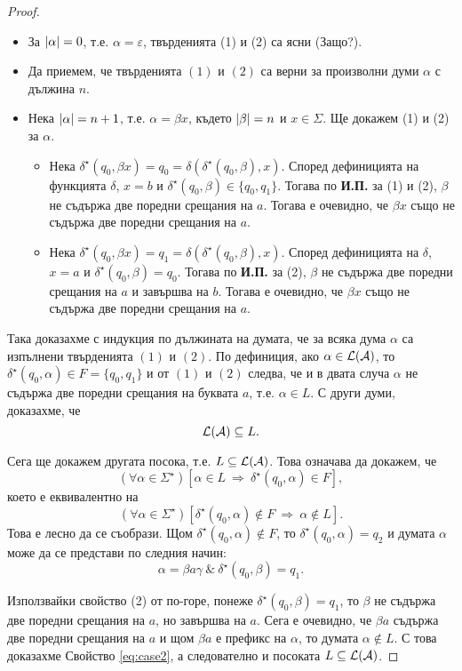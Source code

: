 \begin{proof}
 \begin{itemize}
 \item
   За $\lvert{\alpha}\rvert = 0$, т.е. $\alpha = \varepsilon$, твърденията (1) и (2) са ясни (Защо?).
 \item
   Да приемем, че твърденията $(1)$ и $(2)$ са верни за произволни думи $\alpha$ с дължина $n$.
 \item
   Нека $\lvert{\alpha}\rvert = n+1$, т.е. $\alpha = \beta x$, където $\lvert{\beta}\rvert = n$ и $x \in \Sigma$.
   Ще докажем (1) и (2) за $\alpha$.
   \begin{itemize}[-]
   \item 
     Нека $\delta^\star(q_0,\beta x) = q_0 = \delta(\delta^\star(q_0,\beta),x)$.
     Според дефиницията на функцията $\delta$, $x = b$ и $\delta^\star(q_0,\beta) \in \{q_0,q_1\}$.
     Тогава по {\bf И.П.} за (1) и (2), $\beta$ не съдържа две поредни срещания на $a$.
     Тогава е очевидно, че $\beta x$ също не съдържа две поредни срещания на $a$.
   \item
     Нека $\delta^\star(q_0,\beta x) = q_1 = \delta(\delta^\star(q_0,\beta),x)$.
     Според дефиницията на $\delta$, $x = a$ и $\delta^\star(q_0,\beta) = q_0$.
     Тогава по {\bf И.П.} за (2), $\beta$ не съдържа две поредни срещания на $a$
     и завършва на $b$.
     Тогава е очевидно, че $\beta x$ също не съдържа две поредни срещания на $a$.
   \end{itemize}
 \end{itemize}
  
 Така доказахме с индукция по дължината на думата, че за всяка дума $\alpha$ са  изпълнени твърденията $(1)$ и $(2)$.
 По дефиниция, ако $\alpha \in \mathcal{L}(\mathcal{A})$, то $\delta^\star(q_0,\alpha) \in F = \{q_0,q_1\}$ и от $(1)$ и $(2)$ следва, че и в двата случа
 $\alpha$ не съдържа две поредни срещания на буквата $a$, т.е. $\alpha \in L$.
 С други думи, доказахме, че 
 \[\mathcal{L}(\mathcal{A}) \subseteq L.\]

 Сега ще докажем другата посока, т.е. $L \subseteq \mathcal{L}(\mathcal{A})$.
 Това означава да докажем, че
 \[(\forall \alpha \in \Sigma^\star)[\alpha \in L\ \Rightarrow\ \delta^\star(q_0,\alpha) \in F],\]
 което е еквивалентно на
 \begin{equation}
   \label{eq:case2}
   (\forall \alpha \in \Sigma^\star)[\delta^\star(q_0,\alpha) \not\in F \ \Rightarrow\ \alpha\not\in L].
 \end{equation}
 Това е лесно да се съобрази.
 Щом $\delta^\star(q_0,\alpha) \not\in F$, то 
 $\delta^\star(q_0,\alpha) = q_2$ и думата $\alpha$ може да се представи по следния начин:
 \[\alpha = \beta a \gamma\ \&\ \delta^\star(q_0,\beta) = q_1.\]
 
 Използвайки свойство (2) от по-горе, понеже $\delta^\star(q_0,\beta) = q_1$, то
 $\beta$ не съдържа две поредни срещания на $a$, но завършва на $a$.
 Сега е очевидно, че $\beta a$ съдържа две поредни срещания на $a$ и 
 щом $\beta a$ е префикс на $\alpha$, то думата $\alpha \not\in L$.
 С това доказахме Свойство \ref{eq:case2}, а следователно и посоката $L\subseteq \mathcal{L}(\mathcal{A})$.
\end{proof}


